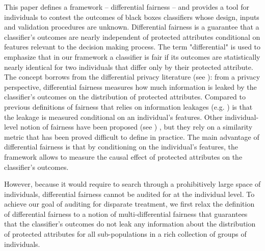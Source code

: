 \documentclass{article}
\begin{document}
\bigskip
 This paper defines a framework -- differential fairness -- and provides a tool for individuals to contest the outcomes of black boxes classifiers whose design, inputs and validation procedures are unknown. Differential fairness is a guarantee that a classifier's outcomes are nearly independent of protected attributes conditional on features relevant to the decision making process. The term "differential" is used to emphasize that in our framework a classifier is fair if its outcomes are statistically nearly identical for two individuals that differ only by their protected attribute. The concept borrows from the differential privacy literature (see \cite{dwork2014algorithmic}): from a privacy perspective, differential fairness  measures how much information is leaked by the classifier's outcomes on the distribution of protected attributes. Compared to previous definitions of fairness that relies on information leakages (e.g. \cite{feldman2015certifying}) is that the leakage is measured conditional on an individual's features. Other individual-level notion of fairness have been proposed (see \cite{dwork2012fairness}) , but they rely on a similarity metric that has been proved difficult to define in practice. The main advantage of differential fairness is that by conditioning on the individual's features, the framework allows to  measure the causal effect of protected attributes on the classifier's outcomes. 
 
 \bigskip
 However, because it would require to search through a prohibitively large space of individuals, differential fairness cannot be audited for at the individual level. To achieve our goal of auditing for disparate treatment, we first relax the definition of differential fairness to a notion of multi-differential fairness that guarantees that the classifier's outcomes do not leak any information about the distribution of protected attributes for all sub-populations in a rich collection of groups of individuals. 
 
\end{document}
